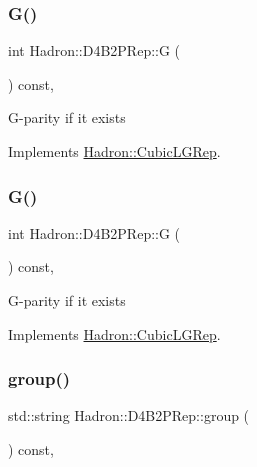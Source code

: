 \subsubsection{\texorpdfstring{G()}{G()}\hspace{0.1cm}{\footnotesize\ttfamily [2/3]}}
{\footnotesize\ttfamily int Hadron\+::\+D4\+B2\+P\+Rep\+::G (\begin{DoxyParamCaption}{ }\end{DoxyParamCaption}) const\hspace{0.3cm}{\ttfamily [inline]}, {\ttfamily [virtual]}}

G-\/parity if it exists 

Implements \mbox{\hyperlink{structHadron_1_1CubicLGRep_ace26f7b2d55e3a668a14cb9026da5231}{Hadron\+::\+Cubic\+L\+G\+Rep}}.

\mbox{\label{structHadron_1_1D4B2PRep_a7a15814601dae2dfb46e08a9d1ff8900}} 
\subsubsection{\texorpdfstring{G()}{G()}\hspace{0.1cm}{\footnotesize\ttfamily [3/3]}}
{\footnotesize\ttfamily int Hadron\+::\+D4\+B2\+P\+Rep\+::G (\begin{DoxyParamCaption}{ }\end{DoxyParamCaption}) const\hspace{0.3cm}{\ttfamily [inline]}, {\ttfamily [virtual]}}

G-\/parity if it exists 

Implements \mbox{\hyperlink{structHadron_1_1CubicLGRep_ace26f7b2d55e3a668a14cb9026da5231}{Hadron\+::\+Cubic\+L\+G\+Rep}}.

\mbox{\label{structHadron_1_1D4B2PRep_aa71574997466ab08fe9b29f7f35ff7f3}} 
\subsubsection{\texorpdfstring{group()}{group()}\hspace{0.1cm}{\footnotesize\ttfamily [1/3]}}
{\footnotesize\ttfamily std\+::string Hadron\+::\+D4\+B2\+P\+Rep\+::group (\begin{DoxyParamCaption}{ }\end{DoxyParamCaption}) const\hspace{0.3cm}{\ttfamily [inline]}, {\ttfamily [virtual]}}

